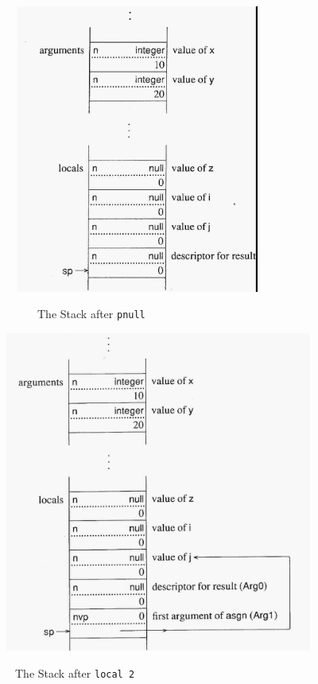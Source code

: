 \ \  \includegraphics[width=3.2063in,height=3.7366in]{ib-img/ib-img047.jpg} 


\ \ \ \ \ \ The Stack after \texttt{pnull}


\bigskip


\bigskip


\bigskip


\bigskip

 \includegraphics[width=4.0602in,height=4.1575in]{ib-img/ib-img048.jpg} 


\ \ The Stack after \texttt{local 2}


